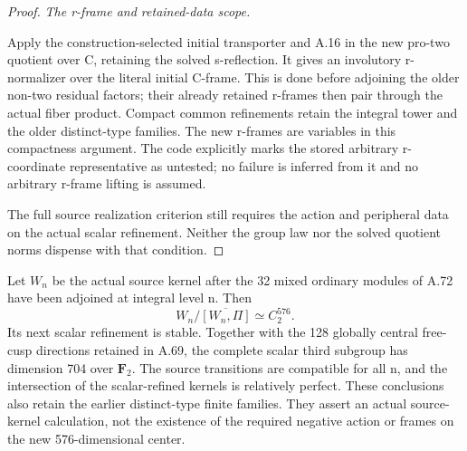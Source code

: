 \begin{proof}
\emph{The r-frame and retained-data scope.}\par
Apply the construction-selected initial transporter and A.16 in the
new pro-two quotient over C, retaining the solved s-reflection. It
gives an involutory r-normalizer over the literal initial C-frame.
This is done before adjoining the older non-two residual factors;
their already retained r-frames then pair through the actual fiber
product. Compact common refinements retain the integral tower and
the older distinct-type families. The new r-frames are variables in
this compactness argument. The code explicitly marks the stored
arbitrary r-coordinate representative as untested; no failure is
inferred from it and no arbitrary r-frame lifting is assumed.

The full source realization criterion still requires the action and
peripheral data on the actual scalar refinement. Neither the group
law nor the solved quotient norms dispense with that condition.
\end{proof}


Let \(W_n\) be the actual source kernel after the 32 mixed ordinary
modules of A.72 have been adjoined at integral level n. Then
\[
 W_n/\overline{[W_n,\Pi]}\simeq C_2^{576}.
 \tag{A.73.1}
\]
Its next scalar refinement is stable. Together with the 128 globally
central free-cusp directions retained in A.69, the complete scalar
third subgroup has dimension 704 over \(\mathbf F_2\).
The source transitions are compatible for all n, and the intersection
of the scalar-refined kernels is relatively perfect. These conclusions
also retain the earlier distinct-type finite families. They assert an
actual source-kernel calculation, not the existence of the required
negative action or frames on the new 576-dimensional center.


